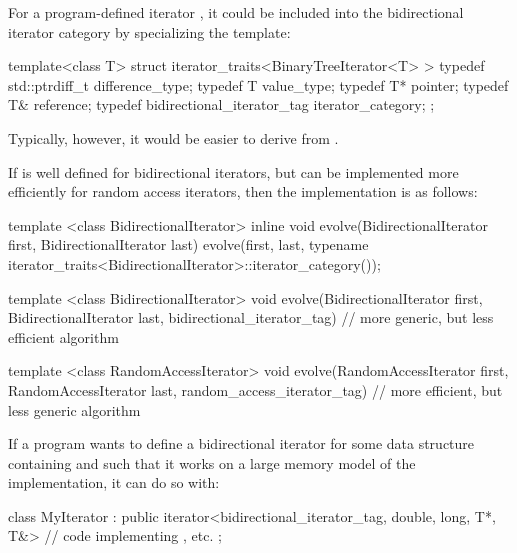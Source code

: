 \pnum
{}%
%
%
%
%
%
\enterexample
For a program-defined iterator
,
it could be included
into the bidirectional iterator category by specializing the
template:

\begin{codeblock}
template<class T> struct iterator_traits<BinaryTreeIterator<T> > {
  typedef std::ptrdiff_t difference_type;
  typedef T value_type;
  typedef T* pointer;
  typedef T& reference;
  typedef bidirectional_iterator_tag iterator_category;
};
\end{codeblock}

Typically, however, it would be easier to derive
from
.
\exitexample

\pnum
\enterexample
If
is well defined for bidirectional iterators, but can be implemented more
efficiently for random access iterators, then the implementation is as follows:

\begin{codeblock}
template <class BidirectionalIterator>
inline void
evolve(BidirectionalIterator first, BidirectionalIterator last) {
  evolve(first, last,
    typename iterator_traits<BidirectionalIterator>::iterator_category());
}

template <class BidirectionalIterator>
void evolve(BidirectionalIterator first, BidirectionalIterator last,
  bidirectional_iterator_tag) {
  // more generic, but less efficient algorithm
}

template <class RandomAccessIterator>
void evolve(RandomAccessIterator first, RandomAccessIterator last,
  random_access_iterator_tag) {
  // more efficient, but less generic algorithm
}
\end{codeblock}
\exitexample

\pnum
\enterexample
If a \Cpp program wants to define a bidirectional iterator for some data structure containing
and such that it
works on a large memory model of the implementation, it can do so with:

\begin{codeblock}
class MyIterator :
  public iterator<bidirectional_iterator_tag, double, long, T*, T&> {
  // code implementing \tcode{++}, etc.
};
\end{codeblock}

